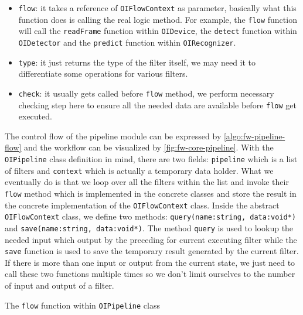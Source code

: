 \begin{itemize}
    \item \texttt{flow}: it takes a reference of \texttt{OIFlowContext} as
    parameter, basically what this function does is calling the real logic
    method. For example, the \texttt{flow} function will call the
    \texttt{readFrame} function within \texttt{OIDevice}, the \texttt{detect}
    function within \texttt{OIDetector} and the \texttt{predict} function
    within \texttt{OIRecognizer}.

    \item \texttt{type}: it just returns the type of the filter itself, we may
    need it to differentiate some operations for various filters.

    \item \texttt{check}: it usually gets called before \texttt{flow} method,
    we perform necessary checking step here to ensure all the needed data are
    available before \texttt{flow} get executed.
\end{itemize}

The control flow of the pipeline module can be expressed by
\autoref{algo:fw-pipeline-flow} and the workflow can be visualized by
\autoref{fig:fw-core-pipeline}. With the \texttt{OIPipeline} class
definition in mind, there are two fields: \texttt{pipeline} which is a list of
filters and \texttt{context} which is actually a temporary data holder.
What we eventually do is that we loop over all the filters within the list and
invoke their \texttt{flow} method which is implemented in the concrete
classes and store the result in the concrete implementation of the
\texttt{OIFlowContext} class.
Inside the abstract \texttt{OIFlowContext} class, we define two methods:
\texttt{query(name:string, data:void*)} and \texttt{save(name:string,
data:void*)}. The method \texttt{query} is used to lookup the needed input
which output by the preceding for current executing filter while the
\texttt{save} function is used to save the temporary result generated by
the current filter. If there is more than one input or output from the current state,
we just need to call these two functions multiple times so we don't limit
ourselves to the number of input and output of a filter.

\begin{algorithm}
    \caption{The \texttt{flow} function within \texttt{OIPipeline} class}
    \label{algo:fw-pipeline-flow}
\end{algorithm}

